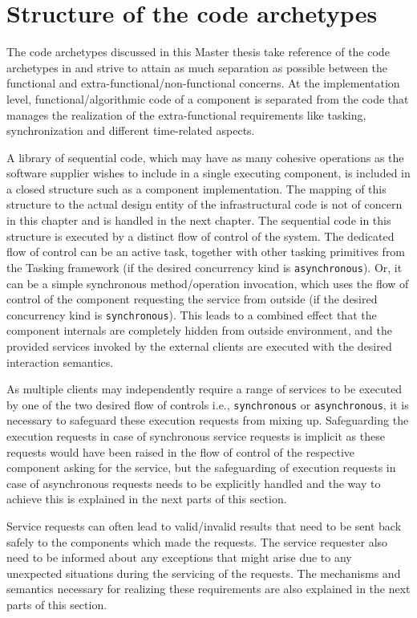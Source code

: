 \section{Structure of the code archetypes}
The code archetypes discussed in this Master thesis take reference of the code archetypes in \cite{EvoRAVCodeAr} and strive to attain as much separation as possible between the functional and extra-functional/non-functional concerns. At the implementation level, functional/algorithmic code of a component is separated from the code that manages the realization of the extra-functional requirements like tasking, synchronization and different time-related aspects.

A library of sequential code, which may have as many cohesive operations as the software supplier wishes to include in a single executing component, is included in a closed structure such as a component implementation. The mapping of this structure to the actual design entity of the infrastructural code is not of concern in this chapter and is handled in the next chapter. The sequential code in this structure is executed by a distinct flow of control of the system. The dedicated flow of control can be an active task, together with other tasking primitives from the Tasking framework (if the desired concurrency kind is \texttt{asynchronous}). Or, it can be a simple synchronous method/operation invocation, which uses the flow of control of the component requesting the service from outside (if the desired concurrency kind is \texttt{synchronous}). This leads to a combined effect that the component internals are completely hidden from outside environment, and the provided services invoked by the external clients are executed with the desired interaction semantics.

As multiple clients may independently require a range of services to be executed by one of the two desired flow of controls i.e., \texttt{synchronous} or \texttt{asynchronous}, it is necessary to safeguard these execution requests from mixing up. Safeguarding the execution requests in case of synchronous service requests is implicit as these requests would have been raised in the flow of control of the respective component asking for the service, but the safeguarding of execution requests in case of asynchronous requests needs to be explicitly handled and the way to achieve this is explained in the next parts of this section.

Service requests can often lead to valid/invalid results that need to be sent back safely to the components which made the requests. The service requester also need to be informed about any exceptions that might arise due to any unexpected situations during the servicing of the requests. The mechanisms and semantics necessary for realizing these requirements are also explained in the next parts of this section. 

